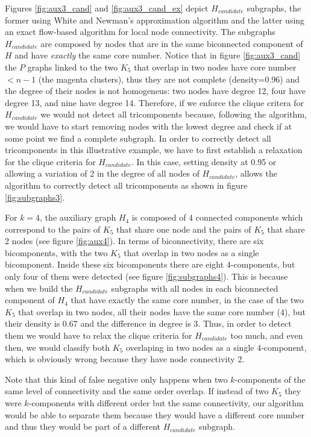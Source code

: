 Figures \ref{fig:aux3_cand} and \ref{fig:aux3_cand_ex} depict $H_{candidate}$ subgraphs, the former using White and Newman's approximation algorithm and the latter using an exact flow-based algorithm for local node connectivity. The subgraphs $H_{candidate}$ are composed by nodes that are in the same biconnected component of $H$ and have \emph{exactly} the same core number. Notice that in figure \ref{fig:aux3_cand} the $P$ graphs linked to the two $K_5$ that overlap in two nodes have core number $< n-1$ (the magenta clusters), thus they are not complete (density=0.96) and the degree of their nodes is not homogeneus: two nodes have degree 12, four have degree 13, and nine have degree 14. Therefore, if we enforce the clique critera for $H_{candidate}$ we would not detect all tricomponents because, following the algorithm, we would have to start removing nodes with the lowest degree and check if at some point we find a complete subgraph. In order to correctly detect all tricomponents in this illustrative example, we have to first establish a relaxation for the clique criteria for $H_{candidate}$. In this case, setting density at 0.95 or allowing a variation of 2 in the degree of all nodes of $H_{candidate}$, allows the algorithm to correctly detect all tricomponents as shown in figure \ref{fig:subgraphs3}.

For $k=4$, the auxiliary graph $H_4$ is composed of 4 connected components which correspond to the pairs of $K_5$ that share one node and the pairs of $K_5$ that share 2 nodes (see figure \ref{fig:aux4}). In terms of biconnectivity, there are six bicomponents, with the two $K_5$ that overlap in two nodes as a single bicomponent. Inside these six bicomponents there are eight 4-components, but only four of them were detected (see figure \ref{fig:subgraphs4}). This is because when we build the $H_{candidate}$ subgraphs with all nodes in each biconnected component of $H_4$ that have exactly the same core number, in the case of the two $K_5$ that overlap in two nodes, all their nodes  have the same core number (4), but their density is 0.67 and the difference in degree is 3. Thus, in order to detect them we would have to relax the clique criteria for $H_{candidate}$ too much, and even then, we would classify both $K_5$ overlaping in two nodes as a single 4-component, which is obviously wrong because they have node connectivity 2.

Note that this kind of false negative only happens when two $k$-components of the same level of connectivity and the same order overlap. If instead of two $K_5$ they were $k$-components with different order but the same connectivity, our algorithm would be able to separate them because they would have a different core number and thus they would be part of a different $H_{candidate}$ subgraph.

